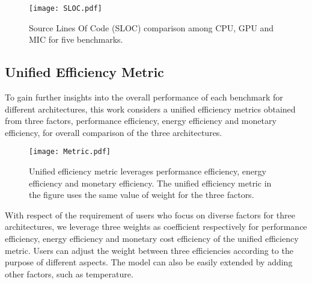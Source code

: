 %

  
    \begin{figure}[h!]
  \centering
  \begin{minipage}{0.5\textwidth}
    \centering
   \centering
     \texttt{[image: SLOC.pdf]}    
  \caption{Source Lines Of Code (SLOC) comparison among CPU, GPU and MIC for five benchmarks.}
  \label{fig:sloc}
\end{minipage}%
\end{figure}

\subsection{Unified Efficiency Metric}

To gain further insights into the overall performance of each benchmark for different architectures, 
this work considers a unified efficiency metrics obtained from three factors, performance efficiency, energy efficiency and 
monetary efficiency, for overall comparison of the three architectures. %

    \begin{figure}[h!]
  \centering
  \begin{minipage}{0.5\textwidth}
    \centering
   \centering
     \texttt{[image: Metric.pdf]}    
  \caption{Unified efficiency metric leverages performance efficiency, energy efficiency and monetary efficiency. %
  The unified efficiency metric in the figure uses the same value of weight for the three factors.}
  \label{fig:metric}
\end{minipage}%
\end{figure}


With respect of the requirement of users who focus on diverse factors for three architectures, we leverage three weights as coefficient respectively for performance efficiency, energy efficiency and monetary cost efficiency of the unified efficiency metric. Users can adjust the weight between three efficiencies according to the purpose of different aspects. The model can also be easily extended by adding other factors, such as temperature. 

